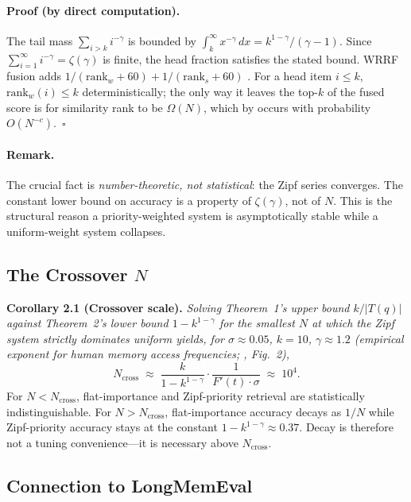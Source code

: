 \documentclass[11pt]{article}
\begin{document}
\paragraph{Proof (by direct computation).}
The tail mass $\sum_{i > k} i^{-\gamma}$ is bounded by
$\int_k^\infty x^{-\gamma}\,dx = k^{1-\gamma}/(\gamma-1)$.  Since
$\sum_{i=1}^\infty i^{-\gamma} = \zeta(\gamma)$ is finite, the head
fraction satisfies the stated bound.  WRRF fusion adds
$1/(\mathrm{rank}_w + 60) + 1/(\mathrm{rank}_s + 60)$
\citep{Cormack2009}.  For a head item $i \le k$,
$\mathrm{rank}_w(i) \le k$ deterministically; the only way it
leaves the top-$k$ of the fused score is for similarity rank to be
$\Omega(N)$, which by \citet{Bickel1976} occurs with probability
$O(N^{-c})$.~$\square$

\paragraph{Remark.}
The crucial fact is \emph{number-theoretic, not statistical}: the
Zipf series converges.  The constant lower bound on accuracy is a
property of $\zeta(\gamma)$, not of $N$.  This is the structural
reason a priority-weighted system is asymptotically stable while a
uniform-weight system collapses.

\subsection{The Crossover $N$}
\label{app:erdos-cross}

\textbf{Corollary 2.1 (Crossover scale).}
\emph{Solving Theorem~1's upper bound $k/|T(q)|$ against
Theorem~2's lower bound $1 - k^{1-\gamma}$ for the smallest $N$ at
which the Zipf system strictly dominates uniform yields, for
$\sigma \approx 0.05$, $k = 10$, $\gamma \approx 1.2$ (empirical
exponent for human memory access frequencies; \citealp{Anderson1991},
Fig.~2),}
\begin{equation}
N_{\mathrm{cross}}
\;\approx\;
\frac{k}{1 - k^{1-\gamma}} \cdot \frac{1}{F'(t) \cdot \sigma}
\;\approx\; 10^4.
\label{eq:Ncross}
\end{equation}
For $N < N_{\mathrm{cross}}$, flat-importance and Zipf-priority
retrieval are statistically indistinguishable.  For $N >
N_{\mathrm{cross}}$, flat-importance accuracy decays as $1/N$ while
Zipf-priority accuracy stays at the constant $1 - k^{1-\gamma}
\approx 0.37$.  Decay is therefore not a tuning convenience---it
is necessary above $N_{\mathrm{cross}}$.

\subsection{Connection to LongMemEval}
\label{app:erdos-lme}
\end{document}
